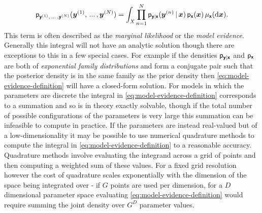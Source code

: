 \begin{equation}\label{eq:model-evidence-definition}
  \mathsf{p}_{\boldsymbol{\mathsf{y}}^{(1)},\,...\,,\boldsymbol{\mathsf{y}}^{(N)}}(\boldsymbol{y}^{(1)},\,...\,,\boldsymbol{y}^{(N)}) =
  \int_{\mathit{X}} \prod_{n=1}^N \mathsf{p}_{\boldsymbol{\mathsf{y}}|\boldsymbol{\mathsf{x}}}(\boldsymbol{y}^{(n)}\operatorname{|}\boldsymbol{x})\,
  \mathsf{p}_{\boldsymbol{\mathsf{x}}}(\boldsymbol{x}) \,\mu_{\boldsymbol{\mathsf{x}}}(\mathrm{d}\boldsymbol{x}).
\end{equation}
This term is often described as the \emph{marginal likelihood} or the \emph{model evidence}. Generally this integral will not have an analytic solution though there are exceptions to this in a few special cases. For example if the densities $\mathsf{p}_{\boldsymbol{\mathsf{y}}|\boldsymbol{\mathsf{x}}}$ and $\mathsf{p}_{\boldsymbol{\mathsf{x}}}$ are both of \emph{exponential family distributions} and form a {conjugate pair} such that the posterior density is in the same family as the prior density then \eqref{eq:model-evidence-definition} will have a closed-form solution. For models in which the parameters are discrete the integral in \eqref{eq:model-evidence-definition} corresponds to a summation and so is in theory exactly solvable, though if the total number of possible configurations of the parameters is very large this summation can be infeasible to compute in practice. If the parameters are instead real-valued but of a low-dimensionality it may be possible to use numerical quadrature methods \citep{davis1967numerical} to compute the integral in \eqref{eq:model-evidence-definition} to a reasonable accuracy. Quadrature methods involve evaluating the integrand across a grid of points and then computing a weighted sum of these values. For a fixed grid resolution however the cost of quadrature scales exponentially with the dimension of the space being integrated over - if $G$ points are used per dimension, for a $D$ dimensional parameter space evaluating \eqref{eq:model-evidence-definition} would require summing the joint density over $G^D$ parameter values.

